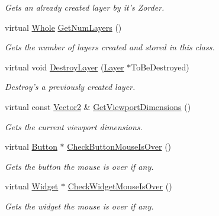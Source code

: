 \begin{DoxyCompactItemize}
\begin{DoxyCompactList}\small\item\em Gets an already created layer by it's Zorder. \item\end{DoxyCompactList}\item 
virtual \hyperlink{namespacephys_a460f6bc24c8dd347b05e0366ae34f34a}{Whole} \hyperlink{classphys_1_1UI_1_1Screen_a93d30de6a8856a6df1018ee9ff3025df}{GetNumLayers} ()
\begin{DoxyCompactList}\small\item\em Gets the number of layers created and stored in this class. \item\end{DoxyCompactList}\item 
virtual void \hyperlink{classphys_1_1UI_1_1Screen_a14b1c36c8d0032a04ec137bfdd6f5122}{DestroyLayer} (\hyperlink{classphys_1_1UI_1_1Layer}{Layer} $\ast$ToBeDestroyed)
\begin{DoxyCompactList}\small\item\em Destroy's a previously created layer. \item\end{DoxyCompactList}\item 
virtual const \hyperlink{classphys_1_1Vector2}{Vector2} \& \hyperlink{classphys_1_1UI_1_1Screen_aacfe41413e7a2fedaa54fb7068d1b1c3}{GetViewportDimensions} ()
\begin{DoxyCompactList}\small\item\em Gets the current viewport dimensions. \item\end{DoxyCompactList}\item 
virtual \hyperlink{classphys_1_1UI_1_1Button}{Button} $\ast$ \hyperlink{classphys_1_1UI_1_1Screen_af427e6b89917acfb81e96923a6a660fd}{CheckButtonMouseIsOver} ()
\begin{DoxyCompactList}\small\item\em Gets the button the mouse is over if any. \item\end{DoxyCompactList}\item 
virtual \hyperlink{classphys_1_1UI_1_1Widget}{Widget} $\ast$ \hyperlink{classphys_1_1UI_1_1Screen_a4f20df93a4ba43bbd1cd9e58e6174e1d}{CheckWidgetMouseIsOver} ()
\begin{DoxyCompactList}\small\item\em Gets the widget the mouse is over if any. \item\end{DoxyCompactList}\item 

\end{DoxyCompactItemize}
